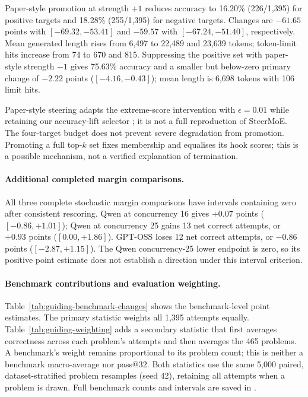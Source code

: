 Paper-style promotion at strength $+1$ reduces accuracy to 16.20\%
(226/1,395) for positive targets and 18.28\% (255/1,395) for negative
targets. Changes are $-61.65$ points with $[-69.32,-53.41]$ and
$-59.57$ with $[-67.24,-51.40]$, respectively. Mean generated length
rises from 6,497 to 22,489 and 23,639 tokens; token-limit hits increase
from 74 to 670 and 815. Suppressing the positive set with paper-style
strength $-1$ gives 75.63\% accuracy and a smaller but below-zero
primary change of $-2.22$ points ($[-4.16,-0.43]$); mean length is
6,698 tokens with 106 limit hits.

Paper-style steering adapts the extreme-score intervention with
$\epsilon=0.01$ while retaining our accuracy-lift selector
\cite{fayyaz2025steermoe}; it is not a full reproduction of SteerMoE.
The four-target budget does not prevent severe degradation from promotion.
Promoting a full top-$k$ set fixes membership and equalises its hook scores;
this is a possible mechanism, not a verified explanation of termination.









\paragraph{Additional completed margin comparisons.}
All three complete stochastic margin comparisons have intervals containing
zero after consistent rescoring. Qwen at concurrency 16 gives $+0.07$
points ($[-0.86,+1.01]$); Qwen at concurrency 25 gains 13 net correct
attempts, or $+0.93$ points ($[0.00,+1.86]$). GPT-OSS loses 12 net
correct attempts, or $-0.86$ points ($[-2.87,+1.15]$). The Qwen
concurrency-25 lower endpoint is zero, so its positive point estimate does
not establish a direction under this interval criterion.





\paragraph{Benchmark contributions and evaluation weighting.}
Table~\ref{tab:guiding-benchmark-changes} shows the benchmark-level point
estimates. The primary statistic weights all 1,395 attempts equally.
Table~\ref{tab:guiding-weighting} adds a secondary statistic that first
averages correctness across each problem's attempts and then averages the
465 problems. A benchmark's weight remains proportional to its problem
count; this is neither a benchmark macro-average nor pass@32. Both
statistics use the same 5,000 paired, dataset-stratified problem resamples
(seed 42), retaining all attempts when a problem is drawn. Full benchmark
counts and intervals are saved in .

